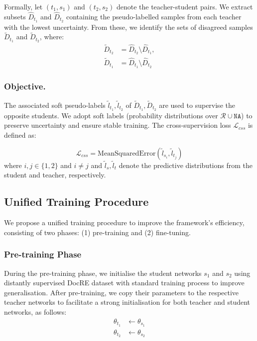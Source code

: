 Formally, let $(t_1, s_1)$ and $(t_2, s_2)$ denote the teacher-student pairs. We extract subsets $\hat{D}_{t_1}$ and $\hat{D}_{t_2}$ containing the pseudo-labelled samples from each teacher with the lowest uncertainty. From these, we identify the sets of disagreed samples $\tilde{D}_{t_1}$ and $\tilde{D}_{t_2}$, where:
\begin{equation*}
    \begin{split}
        \tilde{D}_{t_2} &= \hat{D}_{t_2} \setminus \hat{D}_{t_1}, \\
        \tilde{D}_{t_1} &= \hat{D}_{t_1} \setminus \hat{D}_{t_2}
    \end{split}
\end{equation*}

\subsubsection{Objective.} The associated soft pseudo-labels $\tilde{l}_{t_1}, \tilde{l}_{t_2}$ of $\tilde{D}_{t_1}, \tilde{D}_{t_2}$ are used to supervise the opposite students. We adopt soft labels (probability distributions over $\mathcal{R} \cup \texttt{NA}$) to preserve uncertainty and ensure stable training. The cross-supervision loss $\mathcal{L}_{css}$ is defined as:

\begin{equation}
\label{eq:cross-stage-loss}
\mathcal{L}_{css} = \text{MeanSquaredError}\left(\tilde{l}_{s_i}, \tilde{l}_{t_j}\right)
\end{equation}
\noindent
where $i, j \in \{1,2\}$ and $i \neq j$ and $\tilde{l}_s, \tilde{l}_t$ denote the predictive distributions from the student and teacher, respectively.

\subsection{Unified Training Procedure}
\label{subsec:train-procedure}
We propose a unified training procedure to improve the framework’s efficiency, consisting of two phases: (1) pre-training and (2) fine-tuning.

\subsubsection{Pre-training Phase}
\label{sec:pre-training-stage}
During the pre-training phase, we initialise the student networks $s_1$ and $s_2$ using distantly supervised DocRE dataset with standard training process to improve generalisation. After pre-training, we copy their parameters to the respective teacher networks to facilitate a strong initialisation for both teacher and student networks, as follows:
\begin{equation}
    \label{assign-params}
    \begin{aligned}
        \theta_{t_1} &\leftarrow \theta_{s_1} \\
        \theta_{t_2} &\leftarrow \theta_{s_2}
    \end{aligned}
\end{equation}

